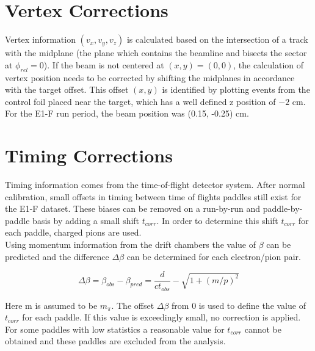 \section{Vertex Corrections}
Vertex information $(v_x, v_y, v_z)$ is calculated based on the intersection of a track with the midplane (the plane which contains the beamline and bisects the sector at $\phi_{rel} = 0$).  If the beam is not centered at $(x,y)=(0,0)$, the calculation of vertex position needs to be corrected by shifting the midplanes in accordance with the target offset.  This offset $(x,y)$ is identified by plotting events from the control foil placed near the target, which has a well defined z position of $-2$ cm. \\
      
For the E1-F run period, the beam position was (0.15, -0.25) cm.  


\section{Timing Corrections}
Timing information comes from the time-of-flight detector system.  After normal calibration, small offsets in timing between time of flights paddles still exist for the E1-F dataset.  These biases can be removed on a run-by-run and paddle-by-paddle basis by adding a small shift $t_{corr}$.  In order to determine this shift $t_{corr}$ for each paddle, charged pions are used.  \\

Using momentum information from the drift chambers the value of $\beta$ can be predicted and the difference $\Delta \beta$ can be determined for each electron/pion pair. 

\begin{equation}
	\Delta \beta = \beta_{obs} - \beta_{pred} = \frac{d}{c t_{obs}} - \sqrt{1+(m/p)^2} 
\end{equation} 

Here m is assumed to be $m_{\pi}$.  The offset $\Delta \beta$ from 0 is used to define the value of $t_{corr}$ for each paddle.  If this value is exceedingly small, no correction is applied.  For some paddles with low statistics a reasonable value for $t_{corr}$ cannot be obtained and these paddles are excluded from the analysis.  \\

